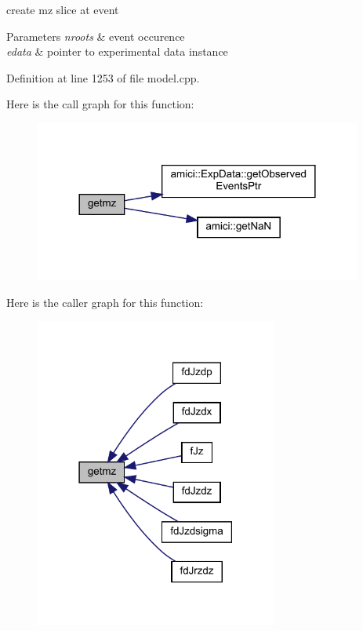 create mz slice at event 
\begin{DoxyParams}{Parameters}
{\em nroots} & event occurence \\
\hline
{\em edata} & pointer to experimental data instance \\
\hline
\end{DoxyParams}


Definition at line 1253 of file model.\+cpp.

Here is the call graph for this function\+:
\nopagebreak
\begin{figure}[H]
\begin{center}
\leavevmode
\includegraphics[width=305pt]{classamici_1_1_model_a523a7d80e06bfab324d566dd6032abcf_cgraph}
\end{center}
\end{figure}
Here is the caller graph for this function\+:
\nopagebreak
\begin{figure}[H]
\begin{center}
\leavevmode
\includegraphics[width=226pt]{classamici_1_1_model_a523a7d80e06bfab324d566dd6032abcf_icgraph}
\end{center}
\end{figure}
\mbox{\label{classamici_1_1_model_aee6c7b534a091180c01aabb3be44a216}} 
